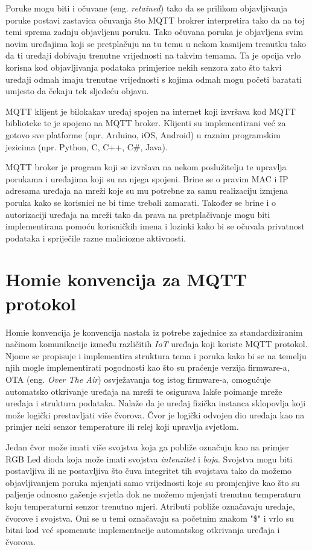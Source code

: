 \documentclass[times, utf8, zavrsni]{fer}
\begin{document}
Poruke mogu biti i očuvane (eng. \textit{retained}) tako da se prilikom objavljivanja poruke postavi zastavica očuvanja što MQTT brokrer interpretira tako da na toj temi sprema zadnju objavljenu poruku.
Tako očuvana poruka je objavljena svim novim uređajima koji se pretplačuju na tu temu u nekom kasnijem trenutku tako da ti uređaji dobivaju trenutne vrijednosti na takvim temama.
Ta je opcija vrlo korisna kod objavljivanja podataka primjerice nekih senzora zato što takvi uređaji odmah imaju trenutne vrijednosti s kojima odmah mogu početi baratati umjesto da čekaju tek sljedeću objavu.

MQTT klijent je bilokakav uređaj spojen na internet koji izvršava kod MQTT biblioteke te je spojeno na MQTT broker.
Klijenti su implementirani već za gotovo sve platforme (npr. Arduino, iOS, Android) u raznim programskim jezicima (npr. Python, C, C++, C\#, Java).

MQTT broker je program koji se izvršava na nekom poslužitelju te upravlja porukama i uređajima koji su na njega spojeni.
Brine se o pravim MAC i IP adresama uređaja na mreži koje su mu potrebne za samu realizaciju izmjena poruka kako se korisnici ne bi time trebali zamarati.
Također se brine i o autorizaciji uređaja na mreži tako da prava na pretplačivanje mogu biti implementirana pomoću korisničkih imena i lozinki kako bi se očuvala privatnost podataka i spriječile razne maliciozne aktivnosti.

\section{Homie konvencija za MQTT protokol}
Homie konvencija je konvencija nastala iz potrebe zajednice za standardiziranim načinom komunikacije između različitih \textit{IoT} uređaja koji koriste MQTT protokol.
Njome se propisuje i implementira struktura tema i poruka kako bi se na temelju njih mogle implementirati pogodnosti kao što su praćenje verzija firmware-a, OTA (eng. \textit{Over The Air}) osvježavanja tog istog firmware-a, omogučuje automatsko otkrivanje uređaja na mreži te osigurava lakše poimanje mreže uređaja i struktura podataka.
Nalaže da je uređaj fizička instanca sklopovlja koji može logički prestavljati više čvorova.
Čvor je logički odvojen dio uređaja kao na primjer neki senzor temperature ili relej koji upravlja svjetlom.

Jedan čvor može imati više svojstva koja ga pobliže označuju kao na primjer RGB Led dioda koja može imati svojstva \textit{intenzitet} i \textit{boja}.
Svojstva mogu biti postavljiva ili ne postavljiva što čuva integritet tih svojstava tako da možemo objavljivanjem poruka mjenjati samo vrijednosti koje su promjenjive kao što su paljenje odnosno gašenje svjetla dok ne možemo mjenjati trenutnu temperaturu koju temperaturni senzor trenutno mjeri.
Atributi pobliže označavaju uređaje, čvorove i svojstva.
Oni se u temi označavaju sa početnim znakom "\$" i vrlo su bitni kod već spomenute implementacije automatskog otkrivanja uređaja i čvorova.
\end{document}
